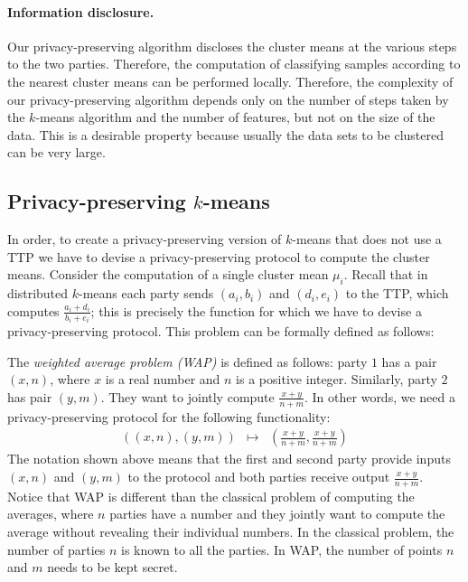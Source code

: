 \paragraph{Information disclosure.} Our privacy-preserving algorithm
discloses the cluster means at the various steps to the two parties.
Therefore, the computation of classifying samples according to the
nearest cluster means can be performed locally. Therefore, the
complexity of our privacy-preserving algorithm depends only on the
number of steps taken by the $k$-means algorithm and the
number of features, but not on the size of the data. This is a desirable property
because usually the data sets to be clustered can be very large.

\subsection{Privacy-preserving $k$-means}

In order, to create a privacy-preserving version of $k$-means that does
not use a TTP we have to devise a privacy-preserving protocol to
compute the cluster means. Consider the computation of a single
cluster mean $\mu_i$. Recall that in distributed $k$-means each
party sends $(a_i,b_i)$ and $(d_i,e_i)$ to the TTP, which computes
$\frac{a_i+d_i}{b_i+e_i}$; this is precisely the function for which
we have to devise a privacy-preserving protocol. This problem can be
formally defined as follows:

\begin{definition}
\rm
The {\em weighted average problem (WAP)} is defined as follows:
party $1$ has a pair $(x,n)$, where $x$ is a real number and $n$ is
a positive integer. Similarly, party $2$ has pair $(y,m)$. They want
to jointly compute $\frac{x+y}{n+m}$. In other words, we need a 
privacy-preserving protocol for the following functionality:
\begin{eqnarray*}
((x,n),(y,m)) & \longmapsto & (\frac{x+y}{n+m}, \frac{x+y}{n+m})
\end{eqnarray*}
The notation shown above means that the first and second party provide
inputs $(x,n)$ and $(y,m)$ to the protocol and both parties receive
output $\frac{x+y}{n+m}$. Notice that WAP is different than the classical
problem of computing the averages, where $n$ parties have a number and 
they jointly want to compute the average without revealing their individual
numbers. In the classical problem, the number of parties $n$ is known
to all the parties. In WAP, the number of points $n$ and $m$ needs to
be kept secret. 
\end{definition}

